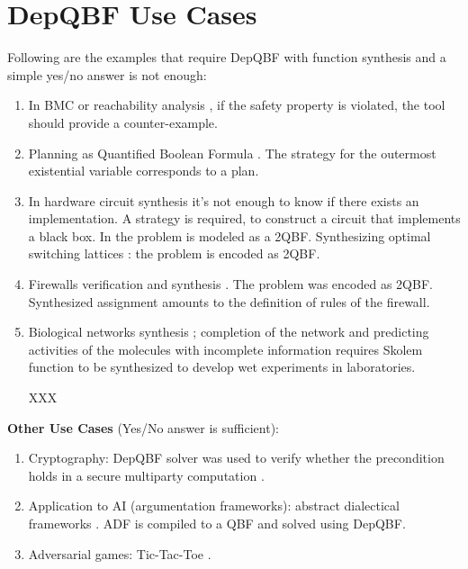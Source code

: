 \documentclass[runningheads]{llncs}
\newcommand{\0}{0}
\newcommand{\1}{1}
\begin{document}
\section{DepQBF Use Cases}
\label{sec:todos}

Following are the examples that require DepQBF with function synthesis and a simple yes/no answer is not enough:
\begin{enumerate}
	\item In BMC or reachability analysis \cite{BloemKS14}, if the safety property is violated, the tool should provide a counter-example. 
	
	\item Planning as Quantified Boolean Formula \cite{Cashmore2012planning, EglyKLP17, Gasquet18}. The strategy for the outermost existential variable corresponds to a plan. 
	\item In hardware circuit synthesis \cite{BloemEKKL14, BloemKS14, Faymonville2017, Subramanyan2013, Li2013} it's not enough to know if there exists an implementation. A strategy is required, to construct a circuit that implements a black box. In \cite{Subramanyan2013, Li2013} the problem is modeled as a 2QBF. Synthesizing optimal switching lattices \cite{Gange2014synthesizing}: the problem is encoded as 2QBF. 
	\item Firewalls verification and synthesis \cite{Zhang2012verification}. The problem was encoded as 2QBF. Synthesized assignment amounts to the definition of rules of the firewall.
	\item Biological networks synthesis \cite{GuptaMS18}; completion of the network and predicting activities of the molecules with incomplete information requires Skolem function to be synthesized to develop wet experiments in laboratories.  
	
	XXX
\end{enumerate}

\textbf{Other Use Cases} (Yes/No answer is sufficient):
\begin{enumerate}
	\item Cryptography: DepQBF solver was used to verify whether the precondition holds in a secure multiparty computation \cite{Launchbury2014application}. 
	\item Application to AI (argumentation frameworks): abstract dialectical frameworks \cite{Brewka2020solving, Diller2014reasoning}. ADF is compiled to a QBF and solved using DepQBF.
	\item Adversarial games: Tic-Tac-Toe \cite{DiptaramaYS16}.
\end{enumerate}
\end{document}

